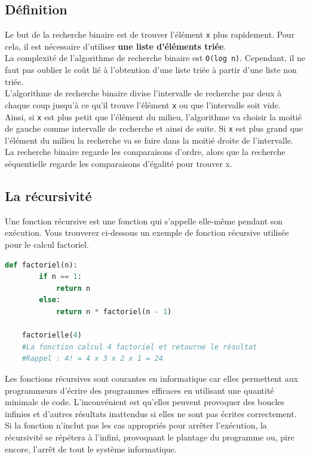 \subsection{Définition}

Le but de la recherche binaire est de trouver l'élément \lstinline{x} plus rapidement. Pour cela, il est nécessaire d'utiliser \textbf{une liste d'éléments triée}.\\

La complexité de l'algorithme de recherche binaire est \lstinline{O(log n)}. Cependant, il ne faut pas oublier le coût lié à l'obtention d'une liste triée à partir d'une liste non triée.\\

L'algorithme de recherche binaire divise l'intervalle de recherche par deux à chaque coup jusqu'à ce qu'il trouve l'élément \lstinline{x} ou que l'intervalle soit vide.\\

Ainsi, si \lstinline{x} est plus petit que l'élément du milieu, l'algorithme va choisir la moitié de gauche comme intervalle de recherche et ainsi de suite. Si \lstinline{x} est plus grand que l'élément du milieu la recherche va se faire dans la moitié droite de l'intervalle.\\

La recherche binaire regarde les comparaisons d'ordre, alors que la recherche séquentielle regarde les comparaisons d'égalité pour trouver x.\\

\subsection{La récursivité}

Une fonction récursive est une fonction qui s'appelle elle-même pendant son exécution. Vous trouverez ci-dessous un exemple de fonction récursive utilisée pour le calcul factoriel.

\begin{lstlisting}[language=Python]
    def factoriel(n):
        if n == 1:
            return n
        else:
            return n * factoriel(n - 1)
            
    factorielle(4)
    #La fonction calcul 4 factoriel et retourne le résultat 
    #Rappel : 4! = 4 x 3 x 2 x 1 = 24
\end{lstlisting}

Les fonctions récursives sont courantes en informatique car elles permettent aux programmeurs d'écrire des programmes efficaces en utilisant une quantité minimale de code. L'inconvénient est qu'elles peuvent provoquer des boucles infinies et d'autres résultats inattendus si elles ne sont pas écrites correctement. Si la fonction n'inclut pas les cas appropriés pour arrêter l'exécution, la récursivité se répétera à l'infini, provoquant le plantage du programme ou, pire encore, l'arrêt de tout le système informatique.\\
   
